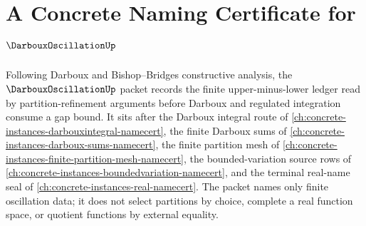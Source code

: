 \chapter{A Concrete Naming Certificate for $\DarbouxOscillationUp$}
\label{ch:concrete-instances-darboux-oscillation-namecert}

Following Darboux and Bishop--Bridges constructive analysis, the $\DarbouxOscillationUp$ packet records the finite upper-minus-lower ledger read by partition-refinement arguments before Darboux and regulated integration consume a gap bound. It sits after the Darboux integral route of \autoref{ch:concrete-instances-darbouxintegral-namecert}, the finite Darboux sums of \autoref{ch:concrete-instances-darboux-sums-namecert}, the finite partition mesh of \autoref{ch:concrete-instances-finite-partition-mesh-namecert}, the bounded-variation source rows of \autoref{ch:concrete-instances-boundedvariation-namecert}, and the terminal real-name seal of \autoref{ch:concrete-instances-real-namecert}. The packet names only finite oscillation data; it does not select partitions by choice, complete a real function space, or quotient functions by external equality.

